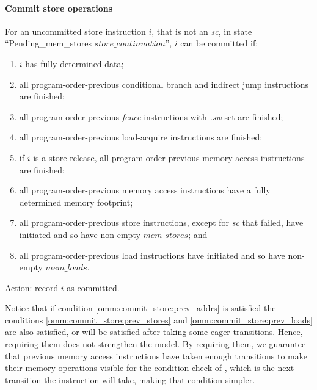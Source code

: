 \paragraph{Commit store operations}\label{omm:commit_stores}
For an uncommitted store instruction $i$, that is not an {\em sc}, in state ``{\sc Pending\_mem\_stores} $store\_continuation$'', $i$ can be committed if:
\begin{enumerate}
\item $i$ has fully determined data;
\item all program-order-previous conditional branch and indirect jump instructions are finished;
\item all program-order-previous {\em fence} instructions with {\em .sw} set are finished;
\item all program-order-previous load-acquire instructions are finished;
\item  if $i$ is a store-release, all program-order-previous memory access instructions are finished;
\item\label{omm:commit_store:prev_addrs} all program-order-previous memory access instructions have a fully determined memory footprint;
\item\label{omm:commit_store:prev_stores} all program-order-previous store instructions, except for {\em sc} that failed, have initiated and so have non-empty $mem\_stores$; and
\item\label{omm:commit_store:prev_loads} all program-order-previous load instructions have initiated and so have non-empty $mem\_loads$.
\end{enumerate}
Action: record $i$ as committed.

\begin{commentary}
Notice that if condition \ref{omm:commit_store:prev_addrs} is satisfied the conditions \ref{omm:commit_store:prev_stores} and \ref{omm:commit_store:prev_loads} are also satisfied, or will be satisfied after taking some eager transitions.
Hence, requiring them does not strengthen the model.
By requiring them, we guarantee that previous memory access instructions have taken enough transitions to make their memory operations visible for the condition check of , which is the next transition the instruction will take, making that condition simpler.
\end{commentary}


